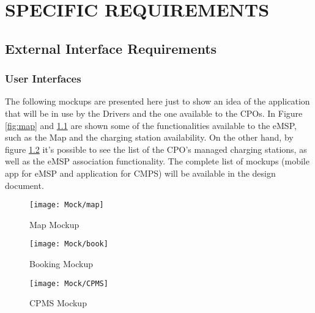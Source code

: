 \newcommand\case{\stepcounter{case}\arabic{case}}
\chapter{SPECIFIC REQUIREMENTS}
\label{ch:specificRequirements}%
\section{External Interface Requirements}
\label{sec:externalInterfaceRequirements}
\subsection{User Interfaces}
\label{subsec:userInterfaces}
The following mockups are presented here just to show an idea of the application
that will be in use by the Drivers and the one available to the CPOs. In Figure \ref{fig:map} and \ref{fig:book} are shown some of the functionalities available to the eMSP, such as the Map and the charging station availability. On the other hand, by figure \ref{fig:CPMS} it's possible to see the list of the CPO's managed charging stations, as well as the eMSP association functionality. The complete list of mockups (mobile app for eMSP and application for CMPS) will be available in the design document.
\begin{figure}[H]
    \begin{minipage}[t]{.35\textwidth} %
    \texttt{[image: Mock/map]}
    \caption{Map Mockup}
    \label{fig:map}
\end{minipage}
\hfill
\begin{minipage}[t]{.35\textwidth}
    \texttt{[image: Mock/book]}
    \caption{Booking Mockup}
    \label{fig:book}
\end{minipage}
\end{figure}
\begin{figure}[H]
            \begin{center}
            \texttt{[image: Mock/CPMS]}
            \caption{CPMS Mockup}
            \label{fig:CPMS}
            \end{center}
        \end{figure}
